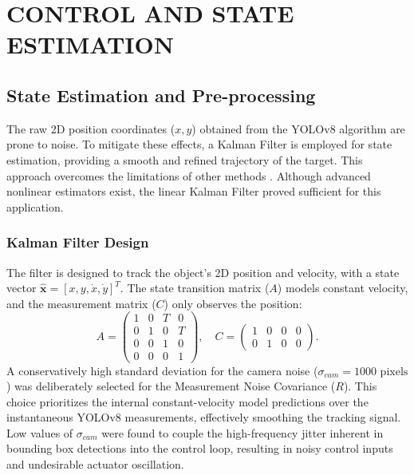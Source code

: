 \documentclass[conference]{IEEEtran}
\begin{document}
\section{CONTROL AND STATE ESTIMATION}

\subsection{State Estimation and Pre-processing}
The raw 2D position coordinates ($x, y$) obtained from the YOLOv8 algorithm are prone to noise. To mitigate these effects, a Kalman Filter is employed for state estimation, providing a smooth and refined trajectory of the target. This approach overcomes the limitations of other methods \cite{Kalmanxalpha}. Although advanced nonlinear estimators exist, the linear Kalman Filter proved sufficient for this application.

\subsubsection{Kalman Filter Design}
The filter is designed to track the object's 2D position and velocity, with a state vector $\hat{\mathbf{x}} = [x, y, \dot{x}, \dot{y}]^T$. The state transition matrix ($A$) models constant velocity, and the measurement matrix ($C$) only observes the position:
\begin{equation*}
A = \begin{pmatrix} 1 & 0 & T & 0 \\ 0 & 1 & 0 & T \\ 0 & 0 & 1 & 0 \\ 0 & 0 & 0 & 1 \end{pmatrix}, \quad C = \begin{pmatrix} 1 & 0 & 0 & 0 \\ 0 & 1 & 0 & 0 \end{pmatrix}.
\end{equation*}
A conservatively high standard deviation for the camera noise ($\sigma_{cam} = 1000 \text{ pixels}$) was deliberately selected for the Measurement Noise Covariance ($R$). This choice prioritizes the internal constant-velocity model predictions over the instantaneous YOLOv8 measurements, effectively smoothing the tracking signal. Low values of $\sigma_{cam}$ were found to couple the high-frequency jitter inherent in bounding box detections into the control loop, resulting in noisy control inputs and undesirable actuator oscillation.
\end{document}
